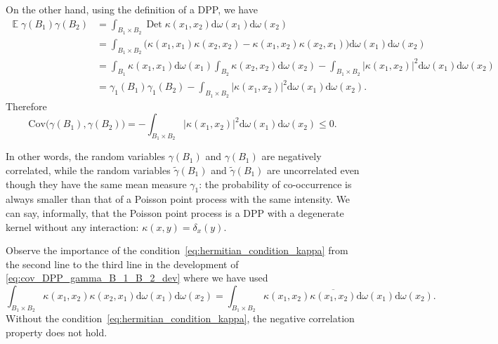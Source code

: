 \documentclass[twoside,11pt]{book}
\numberwithin{theorem}{chapter}
\numberwithin{definition}{chapter}
\numberwithin{proposition}{chapter}
\numberwithin{corollary}{chapter}
\numberwithin{example}{chapter}
\numberwithin{lemma}{chapter}
\numberwithin{assumption}{chapter}
\DeclareMathOperator{\Det}{Det}
\DeclareMathOperator{\EX}{\mathbb{E}}
\begin{document}
On the other hand, using the definition of a DPP, we have
\begin{align}\label{eq:cov_DPP_gamma_B_1_B_2_dev}
\EX \gamma(B_{1}) \gamma(B_{2}) & = \int_{B_{1} \times B_{2}} \Det \kappa(x_{1},x_{2}) \mathrm{d}\omega(x_1) \mathrm{d}\omega(x_2) \nonumber\\
& = \int_{B_{1} \times B_{2}} \Big( \kappa(x_{1},x_{1}) \kappa(x_{2},x_{2}) - \kappa(x_{1},x_{2}) \kappa(x_{2},x_{1}) \Big) \mathrm{d}\omega(x_1) \mathrm{d}\omega(x_2)  \nonumber\\
& = \int_{B_{1}} \kappa(x_{1},x_{1}) \mathrm{d}\omega(x_1) \int_{B_{2}} \kappa(x_{2},x_{2}) \mathrm{d}\omega(x_2) - \int_{B_{1} \times B_{2}} |\kappa(x_{1},x_{2})|^{2} \mathrm{d}\omega(x_1) \mathrm{d}\omega(x_2)  \nonumber\\
& = \gamma_{1}(B_{1}) \gamma_{1}(B_{2}) - \int_{B_{1} \times B_{2}} |\kappa(x_{1},x_{2})|^{2} \mathrm{d}\omega(x_1) \mathrm{d}\omega(x_2). 
\end{align}
Therefore
\begin{equation} \label{eq:cov_DPP_gamma_B_1_B_2}
\mathrm{Cov} \Big(\gamma(B_{1}), \gamma(B_{2}) \Big)  =  - \int_{B_{1} \times B_{2}} |\kappa(x_{1},x_{2})|^{2} \mathrm{d}\omega(x_1) \mathrm{d}\omega(x_2) \leq 0.
\end{equation}

In other words, the random variables $\gamma(B_1)$ and $\gamma(B_1)$ are negatively correlated, while the random variables $\tilde{\gamma}(B_1)$ and $\tilde{\gamma}(B_1)$ are uncorrelated even though they have the same mean measure $\gamma_1$: the probability of co-occurrence is always smaller than that of a Poisson point process with the same intensity. We can say, informally, that the Poisson point process is a DPP with a degenerate kernel without any interaction: $\kappa(x,y) = \delta_{x}(y)$.

Observe the importance of the condition~\ref{eq:hermitian_condition_kappa} from the second line to the third line in the development of \eqref{eq:cov_DPP_gamma_B_1_B_2_dev} where we have used
\begin{equation}
\int_{B_{1} \times B_{2}} \kappa(x_{1},x_{2}) \kappa(x_{2},x_{1}) \mathrm{d}\omega(x_{1}) \mathrm{d}\omega(x_{2}) = \int_{B_{1} \times B_{2}} \kappa(x_{1},x_{2}) \overline{\kappa(x_{1},x_{2})} \mathrm{d}\omega(x_{1}) \mathrm{d}\omega(x_{2}).
\end{equation}
Without the condition~\ref{eq:hermitian_condition_kappa}, the negative correlation property does not hold.
\end{document}
